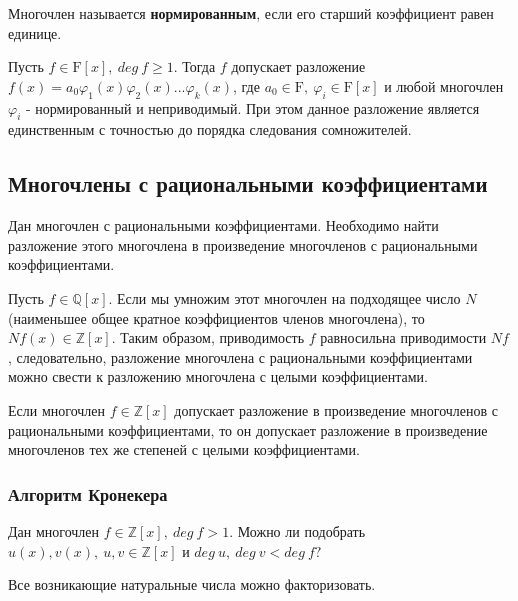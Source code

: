 \documentclass[12pt]{article}
\begin{document}
\begin{defn}
Многочлен называется \textbf{нормированным}, если его старший коэффициент равен единице.
\end{defn}

\begin{thm}
Пусть $f \in \mathrm{F}[x],$\mbox{$~deg~f \geq 1$.} Тогда $f$ допускает разложение $f(x) = a_0 \varphi_1(x) \varphi_2(x) ... \varphi_k(x)$,
 где $a_0 \in \mathrm{F},~\varphi_i \in \mathrm{F}[x]$ и любой многочлен $\varphi_i$ - нормированный и неприводимый. При этом данное разложение является единственным с точностью до порядка следования сомножителей.
\end{thm}

\subsection{Многочлены с рациональными коэффициентами}
\begin{task*}
Дан многочлен с рациональными коэффициентами. Необходимо найти разложение этого многочлена в произведение многочленов с рациональными коэффициентами.
\end{task*}

Пусть $f \in \mathbb{Q}[x].$ Если мы умножим этот многочлен на подходящее число $N$ (наименьшее общее кратное коэффициентов членов многочлена), то $Nf(x) \in \mathbb{Z}[x].$ Таким образом, приводимость $f$ равносильна приводимости $Nf$, следовательно, разложение многочлена с рациональными коэффициентами можно свести к разложению многочлена с целыми коэффициентами. 

\begin{thm}
Если многочлен $f \in \mathbb{Z}[x]$ допускает разложение в произведение многочленов с рациональными коэффициентами, то он допускает разложение в произведение многочленов тех же степеней с целыми коэффициентами.
\end{thm}

\subsubsection{Алгоритм Кронекера}
\begin{task*}
Дан многочлен $f \in \mathbb{Z}[x],~deg~f>1.$ Можно ли подобрать $u(x), v(x), ~u, v \in \mathbb{Z}[x]$ и $deg~u,~deg~v < deg~f?$
\end{task*}

\begin{predp}
Все возникающие натуральные числа можно факторизовать.
\end{predp}
\end{document}
